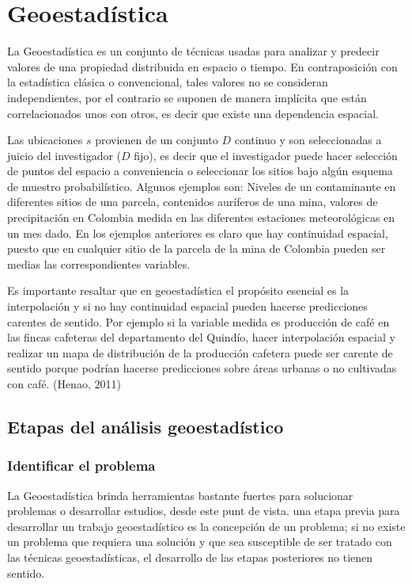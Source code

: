 
\section{Geoestadística}

La Geoestadística es un conjunto de técnicas usadas para analizar y predecir valores de una propiedad distribuida en espacio o tiempo. En contraposición con la estadística clásica o
convencional, tales valores no se consideran independientes, por el contrario se suponen de manera implícita que están correlacionados unos con otros, es decir que existe una dependencia espacial.  \cite{notas_clase2}

Las ubicaciones $s$ provienen de un conjunto $D$ continuo  y son seleccionadas
a juicio del investigador ($D$ fijo), es decir que el investigador puede hacer selección de puntos del espacio a conveniencia o seleccionar los sitios bajo algún esquema de muestro probabilístico. Algunos ejemplos  son: Niveles de un contaminante en diferentes sitios de una
parcela, contenidos auríferos de una mina, valores de precipitación en Colombia medida en
las diferentes estaciones meteorológicas en un mes dado. En los ejemplos anteriores es claro que hay continuidad espacial, puesto que en cualquier sitio de la parcela de la mina de Colombia pueden ser medias las
correspondientes variables.

Es importante resaltar que en geoestadística el propósito esencial es la interpolación y si no hay continuidad espacial pueden hacerse predicciones carentes de sentido. Por ejemplo si la variable medida es producción de café en las fincas
cafeteras del departamento del Quindío, hacer interpolación espacial y realizar un mapa de
distribución de la producción cafetera puede ser carente de sentido porque podrían hacerse
predicciones sobre áreas urbanas o no cultivadas con café. (Henao, 2011) \cite{giraldo}

\subsection{Etapas del análisis geoestadístico}

\subsubsection{Identificar el problema}
La Geoestadística brinda herramientas bastante fuertes para solucionar problemas o desarrollar estudios, desde este punt de vista. una etapa previa para desarrollar un trabajo geoestadístico es la concepción de un problema; si no existe un problema que requiera una solución y que sea susceptible de ser tratado con las técnicas geoestadísticas, el desarrollo de las etapas posteriores no tienen sentido.

